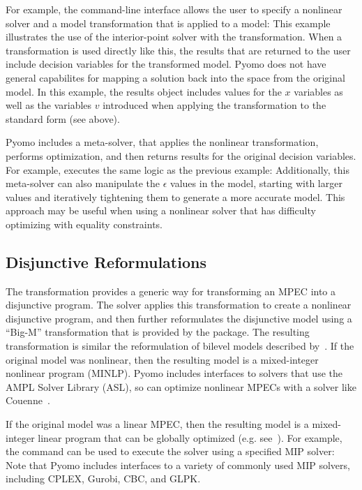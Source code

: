 For example, the  command-line interface allows the
user to specify a nonlinear solver and a model transformation that
is applied to a model:
This example illustrates the use of the  interior-point
solver with the\linebreak {} transformation.  
When a transformation is used directly like this, the results
that are returned to the user include decision variables for the transformed
model.  Pyomo does not have general capabilites for mapping a
solution back into the space from the original model.  In this
example, the results object includes values for the $x$ variables
as well as the variables $v$ introduced when applying the transformation
to the standard form (see above).

Pyomo includes a meta-solver,  that applies the
nonlinear transformation, performs optimization, and then returns
results for the original decision variables.  For example,  
executes the same logic as the previous  example:
Additionally, this meta-solver can also manipulate the $\epsilon$
values in the model, starting with larger values and iteratively
tightening them to generate a more accurate model.
This approach may be useful when using a nonlinear solver that has difficulty
optimizing with equality constraints.
\fi


\subsection{Disjunctive Reformulations}

The  transformation provides a generic
way for transforming an MPEC into a disjunctive program.  The
 solver applies this transformation to create a
nonlinear disjunctive program, and then further reformulates the
disjunctive model using a ``Big-M'' transformation that is provided
by the  package.  The resulting transformation is
similar the reformulation of bilevel models described by~\citet{ForMcC81}.
If the original model was nonlinear, then the resulting model is a
mixed-integer nonlinear program (MINLP).  Pyomo includes interfaces
to solvers that use the AMPL Solver Library (ASL), so  can 
optimize nonlinear MPECs with a solver like Couenne~\cite{COUENNE}.

If the original model was a linear MPEC, then the resulting model
is a mixed-integer linear program that can be globally optimized
(e.g. see~\citet{HuMitPanBenKun08,Jud11}).  For example, the
 command can be used to execute the 
solver using a specified MIP solver:
Note that Pyomo includes interfaces to a variety of commonly used
MIP solvers, including CPLEX, Gurobi, CBC, and GLPK.
\fi


